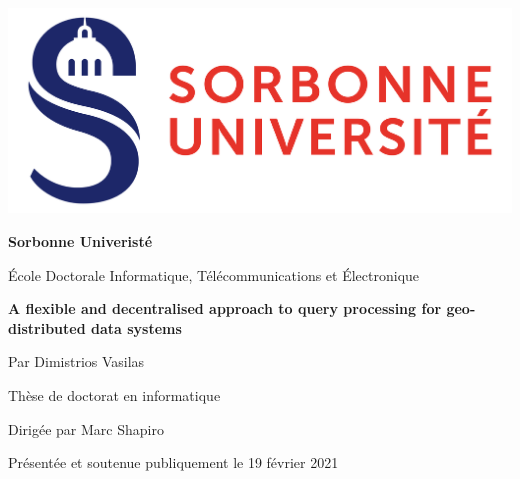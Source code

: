 \documentclass[a4paper,usenames,dvipsnames]{report}
\title{}
\begin{document}
\thispagestyle{empty}


\includegraphics[scale=0.08]{./figures/Logo_Sorbonne_Universite.png}

\vspace*{2cm}

\begin{center}

{\Huge{\bf Sorbonne Univerist\'e}}

\vspace*{1cm}



{\Large\'Ecole Doctorale Informatique, T\'el\'ecommunications et \'Electronique}

\vspace*{1cm}

{\LARGE {\bf A flexible and decentralised approach to query processing for geo-distributed data systems}}

\vspace*{1.5cm}

{\Large Par Dimistrios Vasilas}

\vspace*{1cm}

{\Large Th\`ese de doctorat en informatique}

\vspace*{1cm}

{\Large Dirig\'ee par Marc Shapiro}

\vspace*{1cm}

{\large Pr\'esent\'ee et soutenue publiquement le 19 f\'evrier 2021}

\end{center}
\end{document}
